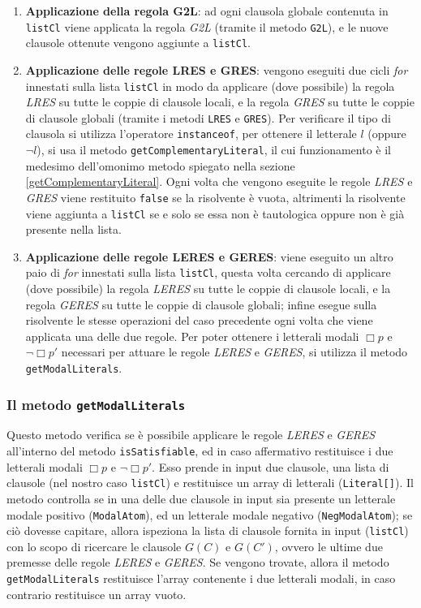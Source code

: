 \documentclass[a4paper,12pt]{report}
\begin{document}
\begin{enumerate}
    \item \textbf{Applicazione della regola G2L}: ad ogni clausola globale contenuta in \texttt{listCl} viene applicata la regola \emph{G2L} (tramite il metodo \texttt{G2L}), e le nuove clausole ottenute vengono aggiunte a \texttt{listCl}.
    
    \item \textbf{Applicazione delle regole LRES e GRES}: vengono eseguiti due cicli \emph{for} innestati sulla lista \texttt{listCl} in modo da applicare (dove possibile) la regola \emph{LRES} su tutte le coppie di clausole locali, e la regola \emph{GRES} su tutte le coppie di clausole globali (tramite i metodi \texttt{LRES} e \texttt{GRES}). Per verificare il tipo di clausola si utilizza l'operatore \texttt{instanceof}, per ottenere il letterale $l$ (oppure $\lnot l$), si usa il metodo \texttt{getComplementaryLiteral}, il cui funzionamento è il medesimo dell'omonimo metodo spiegato nella sezione \ref{getComplementaryLiteral}. Ogni volta che vengono eseguite le regole \emph{LRES} e \emph{GRES} viene restituito \texttt{false} se la risolvente è vuota, altrimenti la risolvente viene aggiunta a \texttt{listCl} se e solo se essa non è tautologica oppure non è già presente nella lista.
    
    \item \textbf{Applicazione delle regole LERES e GERES}: viene eseguito un altro paio di \emph{for} innestati sulla lista \texttt{listCl}, questa volta cercando di applicare (dove possibile) la regola \emph{LERES} su tutte le coppie di clausole locali, e la regola \emph{GERES} su tutte le coppie di clausole globali; infine esegue sulla risolvente le stesse operazioni del caso precedente ogni volta che viene applicata una delle due regole. Per poter ottenere i letterali modali $\Box p$ e $\lnot \Box p'$ necessari per attuare le regole \emph{LERES} e \emph{GERES}, si utilizza il metodo \texttt{getModalLiterals}.
\end{enumerate}

\subsubsection{Il metodo \texttt{getModalLiterals}}
Questo metodo verifica se è possibile applicare le regole \emph{LERES} e \emph{GERES} all'interno del metodo \texttt{isSatisfiable}, ed in caso affermativo restituisce i due letterali modali $\Box p$ e $\lnot \Box p'$. Esso prende in input due clausole, una lista di clausole (nel nostro caso \texttt{listCl}) e restituisce un array di letterali (\texttt{Literal[]}). Il metodo controlla se in una delle due clausole in input sia presente un letterale modale positivo (\texttt{ModalAtom}), ed un letterale modale negativo (\texttt{NegModalAtom}); se ciò dovesse capitare, allora ispeziona la lista di clausole fornita in input (\texttt{listCl}) con lo scopo di ricercare le clausole $G(C)$ e $G(C')$, ovvero le ultime due premesse delle regole \emph{LERES} e \emph{GERES}. Se vengono trovate, allora il metodo \texttt{getModalLiterals} restituisce l'array contenente i due letterali modali, in caso contrario restituisce un array vuoto.
\end{document}

